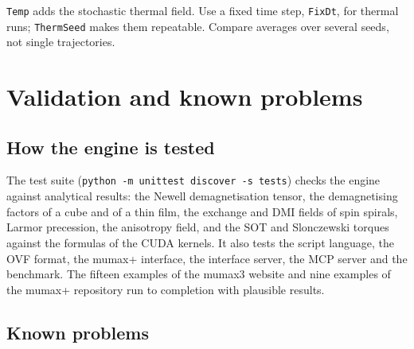\documentclass[11pt,a4paper,oneside]{book}
\newcommand{\code}[1]{\texttt{#1}}
\renewcommand{\_}{\textunderscore\allowbreak}
\begin{document}
\code{Temp} adds the stochastic thermal field. Use a fixed time step, \code{FixDt}, for thermal runs;
\code{ThermSeed} makes them repeatable. Compare averages over several seeds, not single trajectories.

\chapter{Validation and known problems}\label{ch:limits}

\section{How the engine is tested}

The test suite (\code{python -m unittest discover -s tests}) checks the engine against analytical results: the
Newell demagnetisation tensor, the demagnetising factors of a cube and of a thin film, the exchange and DMI
fields of spin spirals, Larmor precession, the anisotropy field, and the SOT and Slonczewski torques against the
formulas of the CUDA kernels. It also tests the script language, the OVF format, the mumax+ interface, the
interface server, the MCP server and the benchmark. The fifteen examples of the mumax3 website and nine examples
of the mumax+ repository run to completion with plausible results.

\section{Known problems}
\end{document}
